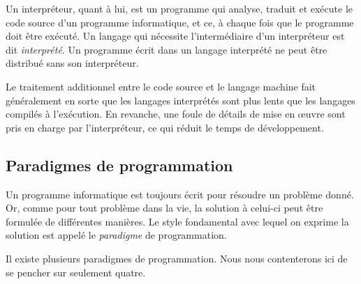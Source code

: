Un interpréteur, quant à lui, est un programme qui
analyse, traduit et exécute le code source d'un programme
informatique, et ce, à chaque fois que le programme doit être exécuté.
Un langage qui nécessite l'intermédiaire d'un interpréteur est dit
\emph{interprété}. Un programme écrit dans un langage interprété ne peut être distribué sans son
interpréteur.

Le traitement additionnel entre le code source et le langage machine
fait généralement en sorte que les langages interprétés sont plus
lents que les langages compilés à l'exécution. En revanche, une foule
de détails de mise en œuvre sont pris en charge par l'interpréteur, ce
qui réduit le temps de développement.


\subsection{Paradigmes de programmation}
\label{sec:informatique:concepts:paradigmes}

Un programme informatique est toujours écrit pour résoudre un problème
donné. Or, comme pour tout problème dans la vie, la solution à
celui-ci peut être formulée de différentes manières. Le style
fondamental avec lequel on exprime la solution est appelé le
\emph{paradigme} de programmation.

Il existe plusieurs paradigmes de programmation. Nous nous
contenterons ici de se pencher sur seulement quatre.

